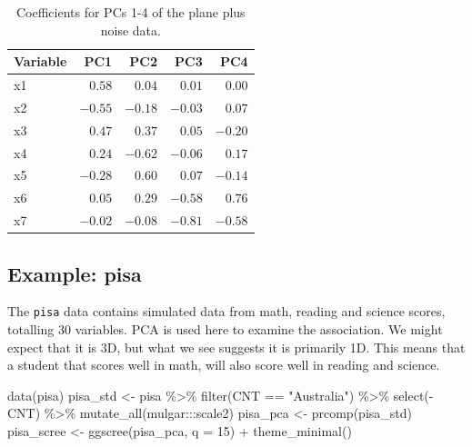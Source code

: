 \documentclass[
  letterpaper,
]{krantz}
\newenvironment{Shaded}{\begin{snugshade}}{\end{snugshade}}
\newcommand{\AttributeTok}[1]{\textcolor[rgb]{0.40,0.45,0.13}{#1}}
\newcommand{\DecValTok}[1]{\textcolor[rgb]{0.68,0.00,0.00}{#1}}
\newcommand{\FunctionTok}[1]{\textcolor[rgb]{0.28,0.35,0.67}{#1}}
\newcommand{\NormalTok}[1]{\textcolor[rgb]{0.00,0.23,0.31}{#1}}
\newcommand{\OtherTok}[1]{\textcolor[rgb]{0.00,0.23,0.31}{#1}}
\newcommand{\SpecialCharTok}[1]{\textcolor[rgb]{0.37,0.37,0.37}{#1}}
\newcommand{\StringTok}[1]{\textcolor[rgb]{0.13,0.47,0.30}{#1}}
\begin{document}
\begin{longtable}{lrrrr}

\caption{\label{tbl-plane-noise-pcs}Coefficients for PCs 1-4 of the
plane plus noise data.}

\tabularnewline

\toprule
Variable & PC1 & PC2 & PC3 & PC4 \\ 
\midrule
x1 & $0.58$ & $0.04$ & $0.01$ & $0.00$ \\ 
x2 & $-0.55$ & $-0.18$ & $-0.03$ & $0.07$ \\ 
x3 & $0.47$ & $0.37$ & $0.05$ & $-0.20$ \\ 
x4 & $0.24$ & $-0.62$ & $-0.06$ & $0.17$ \\ 
x5 & $-0.28$ & $0.60$ & $0.07$ & $-0.14$ \\ 
x6 & $0.05$ & $0.29$ & $-0.58$ & $0.76$ \\ 
x7 & $-0.02$ & $-0.08$ & $-0.81$ & $-0.58$ \\ 
\bottomrule

\end{longtable}

\subsection{Example: pisa}\label{example-pisa}


The \texttt{pisa} data contains simulated data from math, reading and
science scores, totalling 30 variables. PCA is used here to examine the
association. We might expect that it is 3D, but what we see suggests it
is primarily 1D. This means that a student that scores well in math,
will also score well in reading and science.

\begin{Shaded}
\begin{Highlighting}[]
\FunctionTok{data}\NormalTok{(pisa)}
\NormalTok{pisa\_std }\OtherTok{\textless{}{-}}\NormalTok{ pisa }\SpecialCharTok{\%\textgreater{}\%}
  \FunctionTok{filter}\NormalTok{(CNT }\SpecialCharTok{==} \StringTok{"Australia"}\NormalTok{) }\SpecialCharTok{\%\textgreater{}\%}
  \FunctionTok{select}\NormalTok{(}\SpecialCharTok{{-}}\NormalTok{CNT) }\SpecialCharTok{\%\textgreater{}\%}
  \FunctionTok{mutate\_all}\NormalTok{(mulgar}\SpecialCharTok{:::}\NormalTok{scale2)}
\NormalTok{pisa\_pca }\OtherTok{\textless{}{-}} \FunctionTok{prcomp}\NormalTok{(pisa\_std)}
\NormalTok{pisa\_scree }\OtherTok{\textless{}{-}} \FunctionTok{ggscree}\NormalTok{(pisa\_pca, }\AttributeTok{q =} \DecValTok{15}\NormalTok{) }\SpecialCharTok{+} \FunctionTok{theme\_minimal}\NormalTok{()}
\end{Highlighting}
\end{Shaded}
\end{document}

